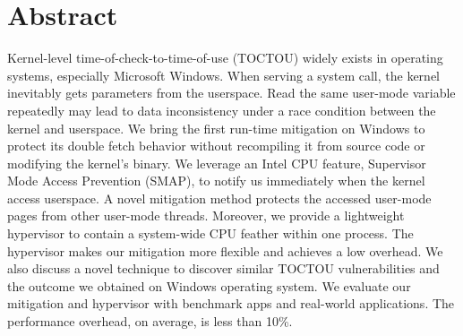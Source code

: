 \section{Abstract}


Kernel-level time-of-check-to-time-of-use (TOCTOU) widely exists in operating systems, especially Microsoft Windows.  When serving a system call, the kernel inevitably gets parameters from the userspace. Read the same user-mode variable repeatedly may lead to data inconsistency under a race condition between the kernel and userspace. We bring the first run-time mitigation on Windows to protect its double fetch behavior without recompiling it from source code or modifying the kernel's binary. We leverage an Intel CPU feature, Supervisor Mode Access Prevention (SMAP), to notify us immediately when the kernel access userspace. A novel mitigation method protects the accessed user-mode pages from other user-mode threads.
Moreover, we provide a lightweight hypervisor to contain a system-wide CPU feather within one process. The hypervisor makes our mitigation more flexible and achieves a low overhead. We also discuss a novel technique to discover similar TOCTOU vulnerabilities and the outcome we obtained on Windows operating system. We evaluate our mitigation and hypervisor with benchmark apps and real-world applications. The performance overhead, on average, is less than 10\%.
